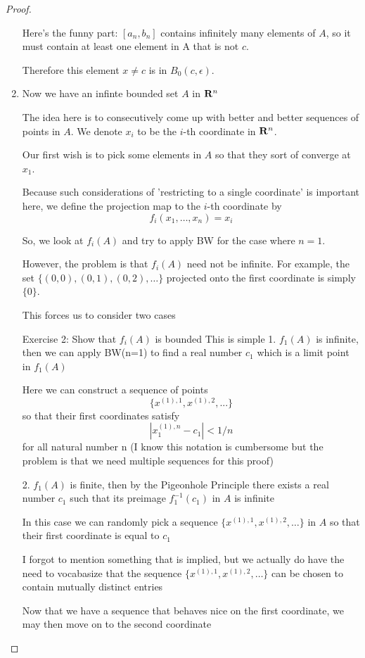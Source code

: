 \begin{proof}
\begin{enumerate}[label=(\alph*)]
Here's the funny part: $[a_n,b_n]$ contains infinitely many elements of $A$, so it must contain at least one element in A that is not $c$.

Therefore this element $x \neq c$ is in $B_0(c,\epsilon)$.

\item Now we have an infinte bounded set $A$ in $\mathbf R^n$

The idea here is to consecutively come up with better and better sequences of points in $A$. We denote $x_i$ to be the $i$-th coordinate in $\mathbf R^n$.

Our first wish is to pick some elements in $A$ so that they sort of converge at $x_1$.

Because such considerations of 'restricting to a single coordinate' is important here, we define the projection map to the $i$-th coordinate by
\[ f_i(x_1,\dots,x_n)=x_i \]

So, we look at $f_i(A)$ and try to apply BW for the case where $n=1$.

However, the problem is that $f_i(A)$ need not be infinite. For example, the set $\{(0,0),(0,1),(0,2),\dots\}$ projected onto the first coordinate is simply $\{0\}$.

This forces us to consider two cases

Exercise 2: Show that $f_i(A)$ is bounded
This is simple
1. $f_1(A)$ is infinite, then we can apply BW(n=1) to find a real number $c_1$ which is a limit point in $f_1(A)$

Here we can construct a sequence of points 
\[ \{x^{(1),1},x^{(1),2},...\} \]
so that their first coordinates satisfy
\[ |x^{(1),n}_1-c_1| < 1/n \]
for all natural number n
(I know this notation is cumbersome but the problem is that we need multiple sequences for this proof)

2. $f_1(A)$ is finite, then by the Pigeonhole Principle there exists a real number $c_1$ such that its preimage $f_1^{-1}(c_1)$ in $A$ is infinite

In this case we can randomly pick a sequence $\{x^{(1),1},x^{(1),2},\dots\}$ in $A$ so that their first coordinate is equal to $c_1$

I forgot to mention something that is implied, but we actually do have the need to vocabasize that the sequence $\{x^{(1),1},x^{(1),2},\dots\}$ can be chosen to contain mutually distinct entries

Now that we have a sequence that behaves nice on the first coordinate, we may then move on to the second coordinate


\end{enumerate}
\end{proof}
